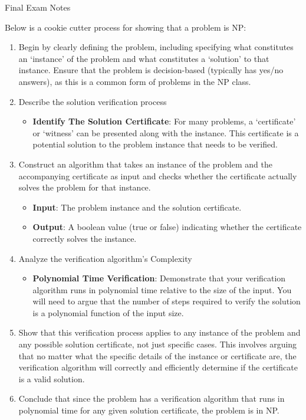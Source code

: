 \begin{examnotes}{Final Exam Notes}
    \begin{highlight}
        Below is a cookie cutter process for showing that a problem is NP:

        \begin{enumerate}
            \item Begin by clearly defining the problem, including specifying what constitutes an `instance' of the problem and what constitutes a `solution' to that instance. Ensure that the problem 
            is decision-based (typically has yes/no answers), as this is a common form of problems in the NP class.
            \item Describe the solution verification process
            \begin{itemize}
                \item \textbf{Identify The Solution Certificate}: For many problems, a `certificate' or `witness' can be presented along with the instance. This certificate is a potential solution to 
                the problem instance that needs to be verified.
            \end{itemize}
            \item Construct an algorithm that takes an instance of the problem and the accompanying certificate as input and checks whether the certificate actually solves the problem for that instance.
            \begin{itemize}
                \item \textbf{Input}: The problem instance and the solution certificate.
                \item \textbf{Output}: A boolean value (true or false) indicating whether the certificate correctly solves the instance.
            \end{itemize}
            \item Analyze the verification algorithm's Complexity
            \begin{itemize}
                \item \textbf{Polynomial Time Verification}: Demonstrate that your verification algorithm runs in polynomial time relative to the size of the input. You will need to argue that the 
                number of steps required to verify the solution is a polynomial function of the input size.
            \end{itemize}
            \item Show that this verification process applies to any instance of the problem and any possible solution certificate, not just specific cases. This involves arguing that no matter what 
            the specific details of the instance or certificate are, the verification algorithm will correctly and efficiently determine if the certificate is a valid solution.
            \item Conclude that since the problem has a verification algorithm that runs in polynomial time for any given solution certificate, the problem is in NP.
        \end{enumerate}
    \end{highlight}


\end{examnotes}
